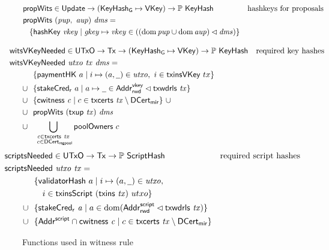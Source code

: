 \begin{figure}[htb]
  \begin{align*}
    & \mathsf{propWits} \in \mathsf{Update} \to (\mathsf{KeyHash_G}\mapsto\mathsf{VKey}) \to \mathbb{P}~\mathsf{KeyHash}
    & \text{hashkeys for proposals} \\
    & \mathsf{propWits}~(\mathit{pup},~\mathit{aup})~\mathit{dms} = \\
    & ~~\left\{
      \mathsf{hashKey}~ \mathit{vkey}
      \mid
      \mathit{gkey}\mapsto\mathit{vkey}\in
      \left(\left(\operatorname{dom}{\mathit{pup}}\cup\operatorname{dom}{\mathit{aup}}\right)\lhd\mathit{dms}\right)
      \right\}
  \end{align*}

    \begin{align*}
    & \hspace{-0.8cm}\fun{witsVKeyNeeded} \in \UTxO \to \Tx \to (\KeyHashGen\mapsto\VKey) \to
      \powerset{\KeyHash}
    & \text{required key hashes} \\
    &  \hspace{-0.8cm}\fun{witsVKeyNeeded}~\var{utxo}~\var{tx}~\var{dms} = \\
    & ~~\{ \fun{paymentHK}~a \mid i \mapsto (a, \wcard) \in \var{utxo},~i\in\fun{txinsVKey}~{tx} \} \\
    \cup & ~~
           \{\fun{stakeCred_r}~a\mid a\mapsto \wcard \in \AddrRWDVKey
      \restrictdom \txwdrls{tx}\}\\
    \cup & ~~\{\cwitness{c} \mid c \in \txcerts{tx} \setminus \DCertMir\}~\cup \\
    \cup & ~~\fun{propWits}~(\fun{txup}~\var{tx})~\var{dms} \\
    \cup & ~~\bigcup_{\substack{c \in \txcerts{tx} \\ ~c \in\DCertRegPool}} \fun{poolOwners}~{c}
  \end{align*}
  \begin{align*}
    & \hspace{-1cm}\fun{scriptsNeeded} \in \UTxO \to \Tx \to
      \powerset{\HashScr}
    & \text{required script hashes} \\
    &  \hspace{-1cm}\fun{scriptsNeeded}~\var{utxo}~\var{tx} = \\
    & ~~\{ \fun{validatorHash}~a \mid i \mapsto (a, \wcard) \in \var{utxo},\\
    & ~~~~~i\in\fun{txinsScript}~{(\fun{txins~\var{tx}})}~{utxo}\} \\
    \cup & ~~\{ \fun{stakeCred_{r}}~\var{a} \mid a \in \dom (\AddrRWDScr
           \restrictdom \fun{txwdrls}~\var{tx}) \} \\
    \cup & ~~\{\AddrScr \cap \fun{cwitness}~\var{c} \mid c \in
           \fun{txcerts}~\var{tx} \setminus \DCertMir\}
  \end{align*}
  \caption{Functions used in witness rule}
  \label{fig:functions-witnesses}
\end{figure}

